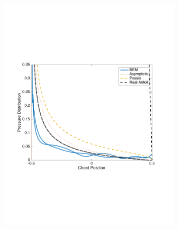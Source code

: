 \documentclass{article}
\begin{document}
\begin{figure}[h]
\centering
\begin{subfigure}{0.3\textwidth}
	\centering
	\includegraphics[width = \textwidth, height=0.16\textheight]{NACA0003_pressure_k10mag}
\end{subfigure}%
\begin{subfigure}{0.3\textwidth}
	\centering

\end{subfigure}
\end{figure}
\end{document}
